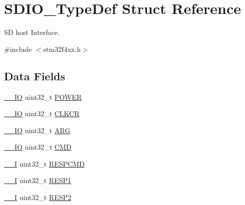 \hypertarget{struct_s_d_i_o___type_def}{}\section{S\+D\+I\+O\+\_\+\+Type\+Def Struct Reference}
\label{struct_s_d_i_o___type_def}


SD host Interface.  




{\ttfamily \#include $<$stm32f4xx.\+h$>$}

\subsection*{Data Fields}
\begin{DoxyCompactItemize}
\item 
\hyperlink{group___c_m_s_i_s__core__definitions_gaec43007d9998a0a0e01faede4133d6be}{\+\_\+\+\_\+\+IO} uint32\+\_\+t \hyperlink{struct_s_d_i_o___type_def_a65bff76f3af24c37708a1006d54720c7}{P\+O\+W\+ER}
\item 
\hyperlink{group___c_m_s_i_s__core__definitions_gaec43007d9998a0a0e01faede4133d6be}{\+\_\+\+\_\+\+IO} uint32\+\_\+t \hyperlink{struct_s_d_i_o___type_def_aa94197378e20fc739d269be49d9c5d40}{C\+L\+K\+CR}
\item 
\hyperlink{group___c_m_s_i_s__core__definitions_gaec43007d9998a0a0e01faede4133d6be}{\+\_\+\+\_\+\+IO} uint32\+\_\+t \hyperlink{struct_s_d_i_o___type_def_a07d4e63efcbde252c667e64a8d818aa9}{A\+RG}
\item 
\hyperlink{group___c_m_s_i_s__core__definitions_gaec43007d9998a0a0e01faede4133d6be}{\+\_\+\+\_\+\+IO} uint32\+\_\+t \hyperlink{struct_s_d_i_o___type_def_adcf812cbe5147d300507d59d4a55935d}{C\+MD}
\item 
\hyperlink{group___c_m_s_i_s__core__definitions_gaf63697ed9952cc71e1225efe205f6cd3}{\+\_\+\+\_\+I} uint32\+\_\+t \hyperlink{struct_s_d_i_o___type_def_aad371db807e2db4a2edf05b3f2f4b6cd}{R\+E\+S\+P\+C\+MD}
\item 
\hyperlink{group___c_m_s_i_s__core__definitions_gaf63697ed9952cc71e1225efe205f6cd3}{\+\_\+\+\_\+I} uint32\+\_\+t \hyperlink{struct_s_d_i_o___type_def_a7b0ee0dc541683266dfab6335abca891}{R\+E\+S\+P1}
\item 
\hyperlink{group___c_m_s_i_s__core__definitions_gaf63697ed9952cc71e1225efe205f6cd3}{\+\_\+\+\_\+I} uint32\+\_\+t \hyperlink{struct_s_d_i_o___type_def_a4d99c78dffdb6e81e8f6b7abec263419}{R\+E\+S\+P2}
\item 

\end{DoxyCompactItemize}
